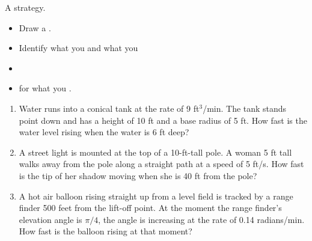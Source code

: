 \documentclass[11pt,fleqn]{article}
\begin{document}
\setlength{\parindent}{0cm}
\renewcommand{\headrulewidth}{0pt}
\newcommand{\blank}[1]{\rule{#1}{0.75pt}}
\renewcommand{\d}{\displaystyle}
\vspace*{-0.7in}
\begin{center}
 {\large{ }}
\end{center}
 	
A strategy.
\begin{itemize}
\item Draw a .
\item Identify what you  and what you  
\item {} 
\item {} for what you .
\end{itemize}

\hrulefill

\begin{enumerate}
\item  Water runs into a conical tank at the rate of 9
ft$^3$/min. The tank stands point down and has a height of 10 ft and a
base radius of 5 ft. How fast is the water level rising when the water
is 6 ft deep?  
\vfill
\newpage
\item  A street light is mounted at the top of a
10-ft-tall pole. A woman 5 ft tall walks away from the pole along a
straight path at a speed of 5 ft/s. How fast is the tip of her shadow moving when she is 40 ft from the pole?
\vfill

\item  A hot air balloon rising straight up from a level
field is tracked by a range finder 500 feet from the lift-off
point. At the moment the range finder's elevation angle is $\pi/4$,
the angle is increasing at the rate of 0.14 radians/min. How fast is
the balloon rising at that moment? 
\vfill
\end{enumerate}
\end{document}
